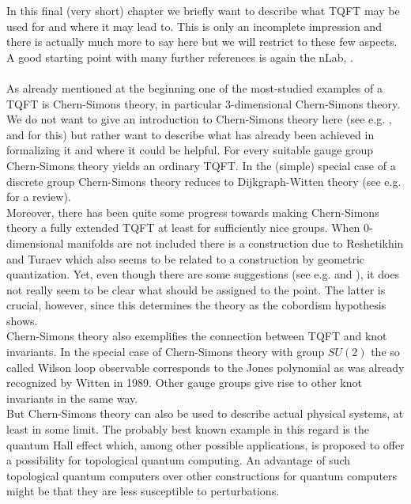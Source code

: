 In this final (very short) chapter we briefly want to describe what TQFT may be used for and where it may lead to. This is only an incomplete impression and there is actually much more to say here but we will restrict to these few aspects. A good starting point with many further references is again the nLab, \cite{wiki-nlab0000}.
\\\\
As already mentioned at the beginning one of the most-studied examples of a TQFT is Chern-Simons theory, in particular $3$-dimensional Chern-Simons theory. We do not want to give an introduction to Chern-Simons theory here (see e.g. \cite{53686c5f}, \cite{2e88d460} and \cite{ed7cdc89} for this) but rather want to describe what has already been achieved in formalizing it and where it could be helpful. For every suitable gauge group Chern-Simons theory yields an ordinary TQFT. In the (simple) special case of a discrete group Chern-Simons theory reduces to Dijkgraph-Witten theory (see e.g. \cite{9efde335} for a review).
\\
Moreover, there has been quite some progress towards making Chern-Simons theory a fully extended TQFT at least for sufficiently nice groups. When $0$-dimensional manifolds are not included there is a construction due to Reshetikhin and Turaev which also seems to be related to a construction by geometric quantization. Yet, even though there are some suggestions (see e.g. \cite{d86ac73d} and \cite{bbecba23}), it does not really seem to be clear what should be assigned to the point. The latter is crucial, however, since this determines the theory as the cobordism hypothesis shows.
\\
Chern-Simons theory also exemplifies the connection between TQFT and knot invariants. In the special case of Chern-Simons theory with group $SU(2)$ the so called Wilson loop observable corresponds to the Jones polynomial as was already recognized by Witten in 1989. Other gauge groups give rise to other knot invariants in the same way.
\\
But Chern-Simons theory can also be used to describe actual physical systems, at least in some limit. The probably best known example in this regard is the quantum Hall effect which, among other possible applications, is proposed to offer a possibility for topological quantum computing. An advantage of such topological quantum computers over other constructions for quantum computers might be that they are less susceptible to perturbations.
